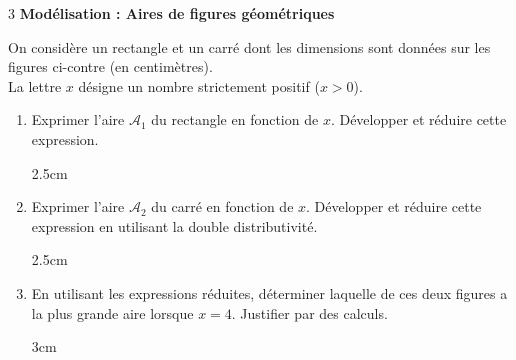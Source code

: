 \documentclass[a4paper]{book}
\begin{document}
{    %
    \begin{exerciceNote}{3}
        \textbf{Modélisation : Aires de figures géométriques} 
        
        \medskip
        \begin{minipage}{0.55\textwidth}
            On considère un rectangle et un carré dont les dimensions sont données sur les figures ci-contre (en centimètres). \\
            La lettre $x$ désigne un nombre strictement positif ($x > 0$).
        \end{minipage}\hfill
        \begin{minipage}{0.4\textwidth}
            \begin{center}
            \end{center}
        \end{minipage}
    
        \smallskip
        \begin{enumerate}
            \item Exprimer l'aire $\mathcal{A}_1$ du rectangle en fonction de $x$. Développer et réduire cette expression.
            \begin{ZoneReponse}{2.5cm}
            \end{ZoneReponse}
            
            \item Exprimer l'aire $\mathcal{A}_2$ du carré en fonction de $x$. Développer et réduire cette expression en utilisant la double distributivité.
            \begin{ZoneReponse}{2.5cm}
            \end{ZoneReponse}
            
            \item En utilisant les expressions réduites, déterminer laquelle de ces deux figures a la plus grande aire lorsque $x = 4$. Justifier par des calculs.
            \begin{ZoneReponse}{3cm}
            \end{ZoneReponse}
        \end{enumerate}
    \end{exerciceNote}


}
\end{document}
